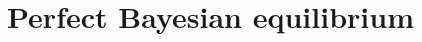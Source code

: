 \documentclass[a4paper,12pt]{article}
\begin{document}
\begin{enumerate}[resume]
\end{enumerate}

\section{Perfect Bayesian equilibrium}
\label{sec:perf-bayes}
\end{document}
